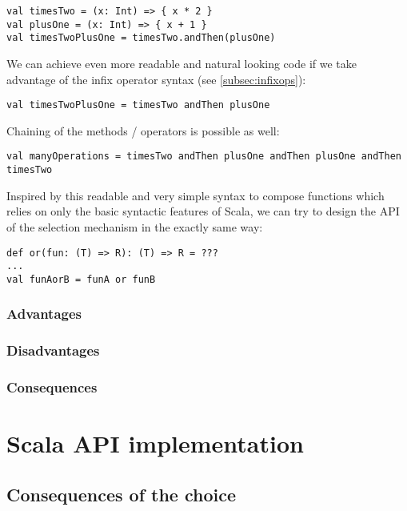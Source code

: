 \lstset{style=Scala}
\begin{lstlisting}
val timesTwo = (x: Int) => { x * 2 }
val plusOne = (x: Int) => { x + 1 }
val timesTwoPlusOne = timesTwo.andThen(plusOne)
\end{lstlisting}

We can achieve even more readable and natural looking code if we take advantage of the infix operator syntax (see \ref{subsec:infixops}):

\lstset{style=Scala}
\begin{lstlisting}
val timesTwoPlusOne = timesTwo andThen plusOne
\end{lstlisting}

Chaining of the methods / operators is possible as well:

\lstset{style=Scala}
\begin{lstlisting}
val manyOperations = timesTwo andThen plusOne andThen plusOne andThen timesTwo
\end{lstlisting}

Inspired by this readable and very simple syntax to compose functions which relies on only the basic syntactic features of Scala, we can try to design the API of the selection mechanism in the exactly same way:

\lstset{style=Scala}
\begin{lstlisting}
def or(fun: (T) => R): (T) => R = ???
...
val funAorB = funA or funB
\end{lstlisting}

\subsubsection{Advantages}
\subsubsection{Disadvantages}
\subsubsection{Consequences}

\section{Scala API implementation}

\subsection{Consequences of the choice}

